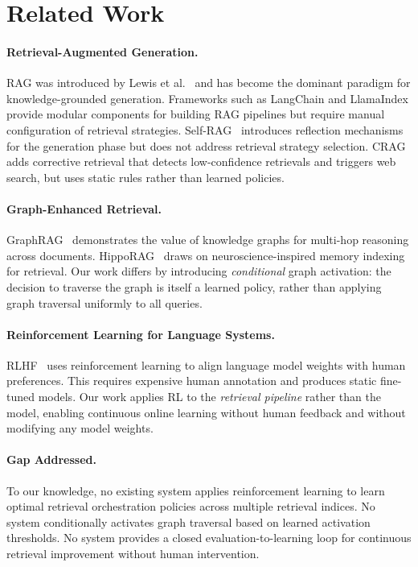 \documentclass[11pt]{article}
\begin{document}
\section{Related Work}
\label{sec:related}

\paragraph{Retrieval-Augmented Generation.}
RAG was introduced by Lewis et al.~\cite{lewis2020rag} and has become the dominant paradigm for knowledge-grounded generation. Frameworks such as LangChain and LlamaIndex provide modular components for building RAG pipelines but require manual configuration of retrieval strategies. Self-RAG~\cite{asai2023selfrag} introduces reflection mechanisms for the generation phase but does not address retrieval strategy selection. CRAG~\cite{yan2024crag} adds corrective retrieval that detects low-confidence retrievals and triggers web search, but uses static rules rather than learned policies.

\paragraph{Graph-Enhanced Retrieval.}
GraphRAG~\cite{edge2024graphrag} demonstrates the value of knowledge graphs for multi-hop reasoning across documents. HippoRAG~\cite{gutierrez2024hipporag} draws on neuroscience-inspired memory indexing for retrieval. Our work differs by introducing \textit{conditional} graph activation: the decision to traverse the graph is itself a learned policy, rather than applying graph traversal uniformly to all queries.

\paragraph{Reinforcement Learning for Language Systems.}
RLHF~\cite{ouyang2022rlhf} uses reinforcement learning to align language model weights with human preferences. This requires expensive human annotation and produces static fine-tuned models. Our work applies RL to the \textit{retrieval pipeline} rather than the model, enabling continuous online learning without human feedback and without modifying any model weights.

\paragraph{Gap Addressed.}
To our knowledge, no existing system applies reinforcement learning to learn optimal retrieval orchestration policies across multiple retrieval indices. No system conditionally activates graph traversal based on learned activation thresholds. No system provides a closed evaluation-to-learning loop for continuous retrieval improvement without human intervention.
\end{document}
